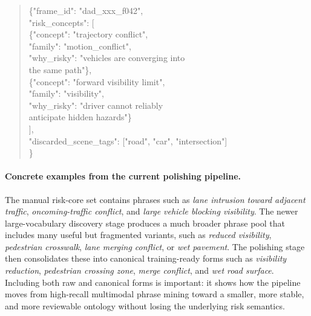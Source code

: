 \begin{quote}
\small
\noindent\parbox{0.95\linewidth}{\raggedright\ttfamily
\{"frame\_id": "dad\_xxx\_f042",\\
"risk\_concepts": [\\
\hspace*{1em}\{"concept": "trajectory conflict",\\
\hspace*{2em}"family": "motion\_conflict",\\
\hspace*{2em}"why\_risky": "vehicles are converging into\\
\hspace*{2em}the same path"\},\\
\hspace*{1em}\{"concept": "forward visibility limit",\\
\hspace*{2em}"family": "visibility",\\
\hspace*{2em}"why\_risky": "driver cannot reliably\\
\hspace*{2em}anticipate hidden hazards"\}\\
],\\
"discarded\_scene\_tags": ["road", "car", "intersection"]\\
\}}
\normalsize
\end{quote}

\paragraph{Concrete examples from the current polishing pipeline.}
The manual risk-core set contains phrases such as \emph{lane intrusion toward
adjacent traffic}, \emph{oncoming-traffic conflict}, and \emph{large vehicle
blocking visibility}. The newer large-vocabulary discovery stage produces a
much broader phrase pool that includes many useful but fragmented variants,
such as \emph{reduced visibility}, \emph{pedestrian crosswalk},
\emph{lane merging conflict}, or \emph{wet pavement}. The polishing stage then
consolidates these into canonical training-ready forms such as
\emph{visibility reduction}, \emph{pedestrian crossing zone},
\emph{merge conflict}, and \emph{wet road surface}. Including both raw and
canonical forms is important: it shows how the pipeline moves from high-recall
multimodal phrase mining toward a smaller, more stable, and more reviewable
ontology without losing the underlying risk semantics.

